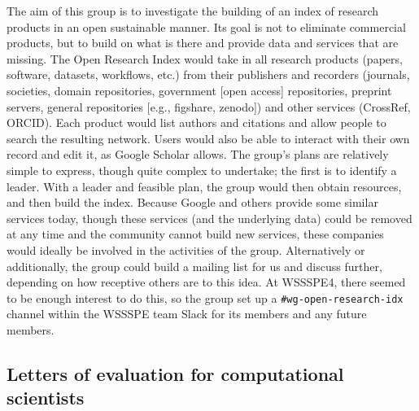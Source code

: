 \documentclass[11pt, oneside]{amsart}
\begin{document}
The aim of this group is to investigate the building of an index of research products in an open sustainable manner.  Its goal is not to eliminate commercial products, but to build on what is there and provide data and services that are missing.
%
The Open Research Index would take in all research products (papers, software, datasets, workflows, etc.) from their publishers and recorders (journals, societies, domain repositories, government [open access] repositories, preprint servers, general repositories [e.g., figshare, zenodo]) and other services (CrossRef, ORCID).
Each product would list authors and citations and allow people to search the resulting network.
Users would also be able to interact with their own record and edit it, as Google Scholar allows.
%
The group's plans are relatively simple to express, though quite complex to undertake; the first is to identify a leader.
With a leader and feasible plan, the group would then obtain resources, and then build the index.
%
Because Google and others provide some similar services today, though these services (and the underlying data) could be removed at any time and the community cannot build new services, these companies would ideally be involved in the activities of the group.
%
Alternatively or additionally, the group could build a mailing list for us and discuss further, depending on how receptive others are to this idea.  At WSSSPE4, there seemed to be enough interest to do this, so the group set up a \texttt{\#wg-open-research-idx} channel within the WSSSPE team Slack for its members and any future members.




\subsection{Letters of evaluation for computational scientists}
\label{sec:letters}
\end{document}
